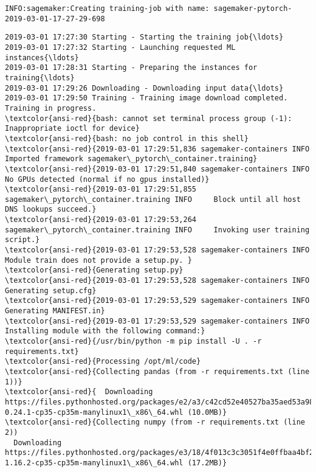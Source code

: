 \documentclass[11pt]{article}
\begin{document}
    \begin{Verbatim}[commandchars=\\\{\}]
INFO:sagemaker:Creating training-job with name: sagemaker-pytorch-2019-03-01-17-27-29-698

    \end{Verbatim}

    \begin{Verbatim}[commandchars=\\\{\}]
2019-03-01 17:27:30 Starting - Starting the training job{\ldots}
2019-03-01 17:27:32 Starting - Launching requested ML instances{\ldots}
2019-03-01 17:28:31 Starting - Preparing the instances for training{\ldots}
2019-03-01 17:29:26 Downloading - Downloading input data{\ldots}
2019-03-01 17:29:50 Training - Training image download completed. Training in progress.
\textcolor{ansi-red}{bash: cannot set terminal process group (-1): Inappropriate ioctl for device}
\textcolor{ansi-red}{bash: no job control in this shell}
\textcolor{ansi-red}{2019-03-01 17:29:51,836 sagemaker-containers INFO     Imported framework sagemaker\_pytorch\_container.training}
\textcolor{ansi-red}{2019-03-01 17:29:51,840 sagemaker-containers INFO     No GPUs detected (normal if no gpus installed)}
\textcolor{ansi-red}{2019-03-01 17:29:51,855 sagemaker\_pytorch\_container.training INFO     Block until all host DNS lookups succeed.}
\textcolor{ansi-red}{2019-03-01 17:29:53,264 sagemaker\_pytorch\_container.training INFO     Invoking user training script.}
\textcolor{ansi-red}{2019-03-01 17:29:53,528 sagemaker-containers INFO     Module train does not provide a setup.py. }
\textcolor{ansi-red}{Generating setup.py}
\textcolor{ansi-red}{2019-03-01 17:29:53,528 sagemaker-containers INFO     Generating setup.cfg}
\textcolor{ansi-red}{2019-03-01 17:29:53,529 sagemaker-containers INFO     Generating MANIFEST.in}
\textcolor{ansi-red}{2019-03-01 17:29:53,529 sagemaker-containers INFO     Installing module with the following command:}
\textcolor{ansi-red}{/usr/bin/python -m pip install -U . -r requirements.txt}
\textcolor{ansi-red}{Processing /opt/ml/code}
\textcolor{ansi-red}{Collecting pandas (from -r requirements.txt (line 1))}
\textcolor{ansi-red}{  Downloading https://files.pythonhosted.org/packages/e2/a3/c42cd52e40527ba35aed53a988c485ffeddbae0722b8b756da82464baa73/pandas-0.24.1-cp35-cp35m-manylinux1\_x86\_64.whl (10.0MB)}
\textcolor{ansi-red}{Collecting numpy (from -r requirements.txt (line 2))
  Downloading https://files.pythonhosted.org/packages/e3/18/4f013c3c3051f4e0ffbaa4bf247050d6d5e527fe9cb1907f5975b172f23f/numpy-1.16.2-cp35-cp35m-manylinux1\_x86\_64.whl (17.2MB)}

\end{Verbatim}
\end{document}
